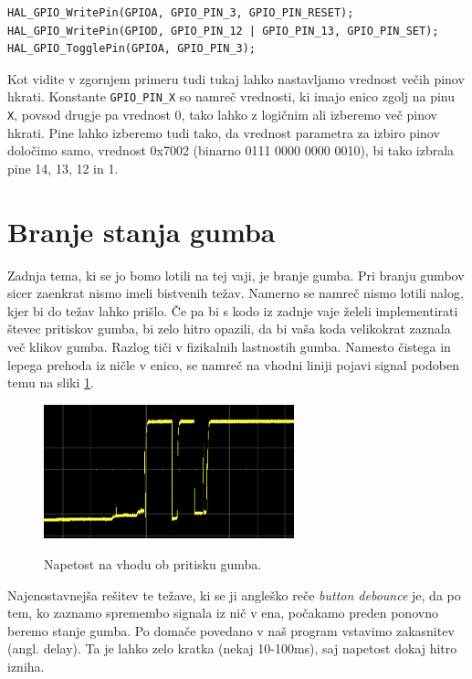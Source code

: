 \documentclass[12pt,letterpaper]{article}
\begin{document}
\begin{center}
\begin{lstlisting}[style=CStyle]
HAL_GPIO_WritePin(GPIOA, GPIO_PIN_3, GPIO_PIN_RESET);
HAL_GPIO_WritePin(GPIOD, GPIO_PIN_12 | GPIO_PIN_13, GPIO_PIN_SET);
HAL_GPIO_TogglePin(GPIOA, GPIO_PIN_3);
\end{lstlisting}
\end{center}
\newpage

Kot vidite v zgornjem primeru tudi tukaj lahko nastavljamo vrednost večih pinov hkrati. Konstante \texttt{GPIO\_PIN\_X} so namreč vrednosti, ki imajo enico zgolj na pinu \texttt{X}, povsod drugje pa vrednost 0, tako lahko z logičnim ali izberemo več pinov hkrati. Pine lahko izberemo tudi tako, da vrednost parametra za izbiro pinov določimo samo, vrednost 0x7002 (binarno 0111 0000 0000 0010), bi tako izbrala pine 14, 13, 12 in 1.


\section*{Branje stanja gumba}

Zadnja tema, ki se jo bomo lotili na tej vaji, je branje gumba. Pri branju gumbov sicer zaenkrat nismo imeli bistvenih težav. Namerno se namreč nismo lotili nalog, kjer bi do težav lahko prišlo. Če pa bi s kodo iz zadnje vaje želeli implementirati števec pritiskov gumba, bi zelo hitro opazili, da bi vaša koda velikokrat zaznala več klikov gumba. Razlog tiči v fizikalnih lastnostih gumba. Namesto čistega in lepega prehoda iz ničle v enico, se namreč na vhodni liniji pojavi signal podoben temu na sliki \ref{debounce}.

\begin{figure}[ht!]
  \centering
  \caption{Napetost na vhodu ob pritisku gumba.}
  \includegraphics[height=110pt]{images/vaja4/debounce.png}
  \label{debounce}
\end{figure}

Najenostavnejša rešitev te težave, ki se ji angleško reče \textit{button debounce} je, da po tem, ko zaznamo spremembo signala iz nič v ena, počakamo preden ponovno beremo stanje gumba. Po domače povedano v naš program vstavimo zakasnitev (angl. delay). Ta je lahko zelo kratka (nekaj 10-100ms), saj napetost dokaj hitro izniha.
\end{document}
